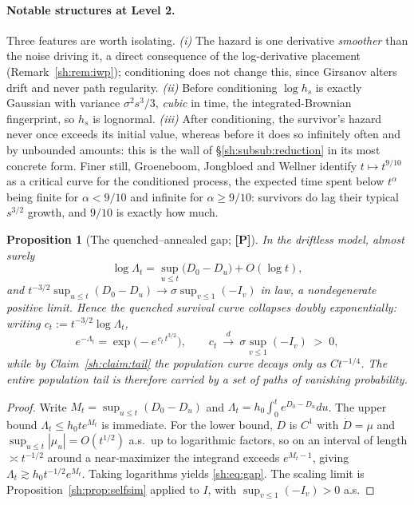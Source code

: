 \documentclass[11pt]{article}
\numberwithin{equation}{section}
\theoremstyle{plain}
\newtheorem{proposition}[theorem]{Proposition}
\theoremstyle{definition}
\theoremstyle{remark}
\begin{document}
\paragraph{Notable structures at Level 2.}\label{sh:rem:sheet:L2}
Three features are worth isolating. \emph{(i)} The hazard is one
derivative \emph{smoother} than the noise driving it, a direct
consequence of the log-derivative placement
(Remark~\ref{sh:rem:iwp}); conditioning does not change this, since
Girsanov alters drift and never path regularity. \emph{(ii)} Before
conditioning $\log h_s$ is exactly Gaussian with variance
$\sigma^2s^3/3$, \emph{cubic} in time, the integrated-Brownian
fingerprint, so $h_s$ is lognormal. \emph{(iii)} After conditioning,
the survivor's hazard never once exceeds its initial value, whereas
before it does so infinitely often and by unbounded amounts: this is the
wall of \S\ref{sh:subsub:reduction} in its most concrete form. Finer
still, Groeneboom, Jongbloed and Wellner \cite{GJW99} identify
$t\mapsto t^{9/10}$ as a critical curve for the conditioned process, the
expected time spent below $t^\alpha$ being finite for $\alpha<9/10$ and
infinite for $\alpha\ge9/10$: survivors do lag their typical
$s^{3/2}$ growth, and $9/10$ is exactly how much.

\begin{proposition}[The quenched--annealed gap; \textbf{[P]}]
\label{sh:prop:gap}
In the driftless model, almost surely
\begin{equation}\label{sh:eq:gap}
\log\Lambda_t=\sup_{u\le t}\bigl(D_0-D_u\bigr)+O(\log t),
\end{equation}
and $t^{-3/2}\sup_{u\le t}(D_0-D_u)\to\sigma\sup_{v\le1}(-I_v)$ in law, a
nondegenerate positive limit. Hence the quenched survival curve
collapses \emph{doubly exponentially}: writing
$c_t:=t^{-3/2}\log\Lambda_t$,
\[
e^{-\Lambda_t}=\exp\bigl(-e^{\,c_t\,t^{3/2}}\bigr),
\qquad
c_t\ \xrightarrow{\;d\;}\ \sigma\sup_{v\le1}(-I_v)\;>\;0,
\]
while by Claim~\ref{sh:claim:tail} the population curve decays only as
$Ct^{-1/4}$. The entire population tail is therefore carried by a set of
paths of vanishing probability.
\end{proposition}

\begin{proof}
Write $M_t=\sup_{u\le t}(D_0-D_u)$ and
$\Lambda_t=h_0\int_0^te^{D_0-D_u}du$. The upper bound
$\Lambda_t\le h_0te^{M_t}$ is immediate. For the lower bound, $D$ is
$C^1$ with $\dot D=\mu$ and $\sup_{u\le t}|\mu_u|=O(t^{1/2})$ a.s.\ up to
logarithmic factors, so on an interval of length $\asymp t^{-1/2}$ around
a near-maximizer the integrand exceeds $e^{M_t-1}$, giving
$\Lambda_t\gtrsim h_0t^{-1/2}e^{M_t}$. Taking logarithms yields
\eqref{sh:eq:gap}. The scaling limit is
Proposition~\ref{sh:prop:selfsim} applied to $I$, with
$\sup_{v\le1}(-I_v)>0$ a.s.
\end{proof}
\end{document}
